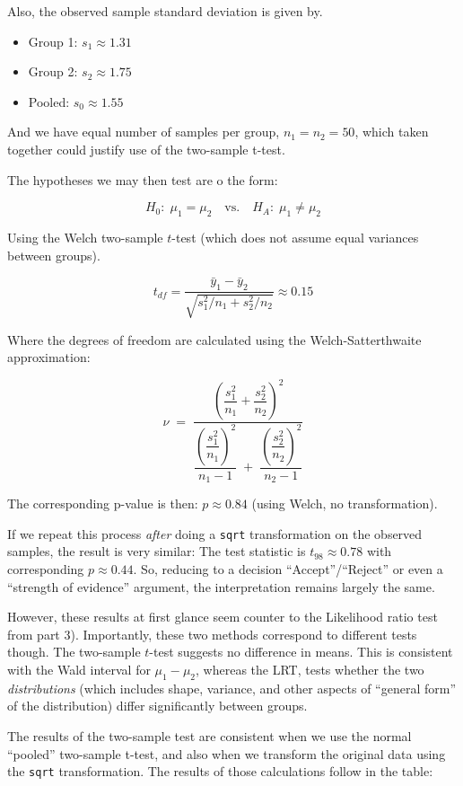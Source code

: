 \documentclass[
]{article}
\begin{document}
Also, the observed sample standard deviation is given by.

\begin{itemize}
\item
  Group 1: \(s_1 \approx 1.31\)
\item
  Group 2: \(s_2 \approx 1.75\)
\item
  Pooled: \(s_0 \approx 1.55\)
\end{itemize}

And we have equal number of samples per group, \(n_1=n_2=50\), which
taken together could justify use of the two-sample t-test.

The hypotheses we may then test are o the form:

\[
H_0:\; \mu_1=\mu_2 \quad\text{vs.}\quad H_A:\; \mu_1\ne \mu_2
\]

Using the Welch two-sample \(t\)-test (which does not assume equal
variances between groups).

\[
t_{df} = \frac{\bar y_1-\bar y_2}{\sqrt{s_1^2/n_1 + s_2^2/n_2}} \approx 0.15
\]

Where the degrees of freedom are calculated using the
Welch-Satterthwaite approximation:

\[
\nu \;=\; 
\frac{\left(\dfrac{s_1^2}{n_1} + \dfrac{s_2^2}{n_2}\right)^{2}}
{\dfrac{\left(\dfrac{s_1^2}{n_1}\right)^{2}}{n_1 - 1} \;+\; \dfrac{\left(\dfrac{s_2^2}{n_2}\right)^{2}}{n_2 - 1}}
\]

The corresponding p-value is then: \(p\approx 0.84\) (using Welch, no
transformation).

If we repeat this process \emph{after} doing a \texttt{sqrt}
transformation on the observed samples, the result is very similar: The
test statistic is \(t_{98} \approx 0.78\) with corresponding
\(p \approx 0.44\). So, reducing to a decision ``Accept''/``Reject'' or
even a ``strength of evidence'' argument, the interpretation remains
largely the same.

However, these results at first glance seem counter to the Likelihood
ratio test from part 3). Importantly, these two methods correspond to
different tests though. The two-sample \(t\)-test suggests no difference
in means. This is consistent with the Wald interval for \(\mu_1-\mu_2\),
whereas the LRT, tests whether the two \emph{distributions} (which
includes shape, variance, and other aspects of ``general form'' of the
distribution) differ significantly between groups.

The results of the two-sample test are consistent when we use the normal
``pooled'' two-sample t-test, and also when we transform the original
data using the \texttt{sqrt} transformation. The results of those
calculations follow in the table:
\end{document}
